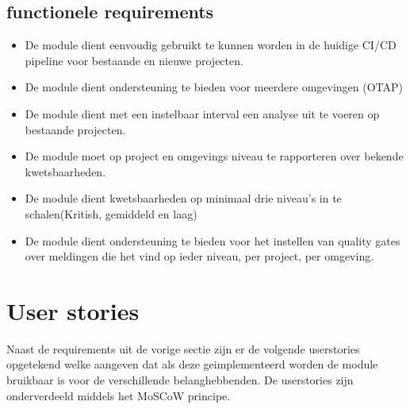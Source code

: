 \subsection{functionele requirements}\label{subsec:functionele-requirements}
\begin{itemize}
    \item De module dient eenvoudig gebruikt te kunnen worden in de huidige CI/CD pipeline voor bestaande en nieuwe projecten.
    \item De module dient ondersteuning te bieden voor meerdere omgevingen (OTAP)
    \item De module dient met een instelbaar interval een analyse uit te voeren op bestaande projecten.
    \item De module moet op project en omgevings niveau te rapporteren over bekende kwetsbaarheden.
    \item De module dient kwetsbaarheden op minimaal drie niveau's in te schalen(Kritish, gemiddeld en laag)
    \item De module dient ondersteuning te bieden voor het instellen van quality gates over meldingen die het vind op ieder niveau, per project, per omgeving.
\end{itemize}


\section{User stories}\label{sec:user-stories}
Naast de requirements uit de vorige sectie zijn er de volgende userstories opgetekend welke aangeven dat als deze geimplementeerd worden de module bruikbaar is voor de verschillende belanghebbenden. De userstories zijn onderverdeeld middels het MoSCoW principe.

